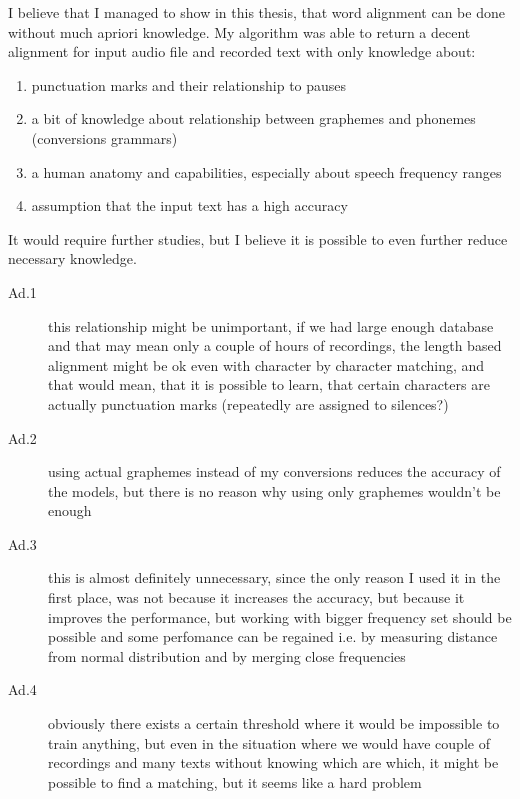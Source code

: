 \documentclass[12pt,a4paper,english]{article}
\begin{document}
I believe that I managed to show in this thesis, that word alignment can be done without much apriori knowledge.
My algorithm was able to return a decent alignment for input audio file and recorded text with only knowledge about:
\begin{enumerate}
    \item punctuation marks and their relationship to pauses
    \item a bit of knowledge about relationship between graphemes and phonemes (conversions grammars)
    \item a human anatomy and capabilities, especially about speech frequency ranges
    \item assumption that the input text has a high accuracy
\end{enumerate}
It would require further studies, but I believe it is possible to even further reduce necessary knowledge.
\begin{description}
    \item[Ad.1] this relationship might be unimportant, if we had large enough database and that may mean only a couple of hours of recordings, \newline
    the length based alignment might be ok even with character by character matching, and that would mean, that it is possible to learn, that certain characters are actually punctuation marks (repeatedly are assigned to silences?)
    \item[Ad.2] using actual graphemes instead of my conversions reduces the accuracy of the models, but there is no reason why using only graphemes wouldn't be enough
    \item[Ad.3] this is almost definitely unnecessary, since the only reason I used it in the first place, was not because it increases the accuracy, but because it improves the performance, but working with bigger frequency set should be possible and some perfomance can be regained i.e. by measuring distance from normal distribution and by merging close frequencies
    \item[Ad.4] obviously there exists a certain threshold where it would be impossible to train anything, but even in the situation where we would have couple of recordings and many texts without knowing which are which, it might be possible to find a matching, but it seems like a hard problem
\end{description}

\newpage
\end{document}
